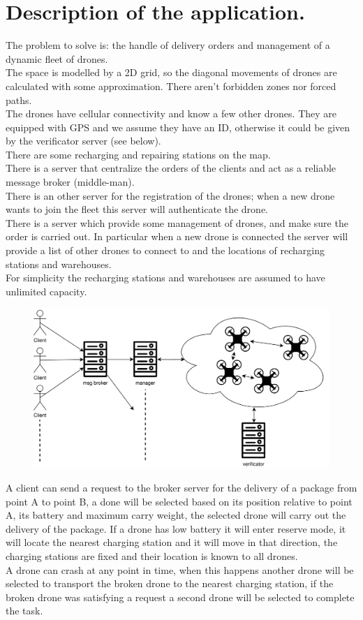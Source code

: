 \documentclass[a4paper, oneside]{memoir}
\begin{document}
\section{Description of the application.}
The problem to solve is: the handle of delivery orders and management of a dynamic fleet of drones.\\
The space is modelled by a 2D grid, so the diagonal movements of drones are calculated with some approximation. There aren't forbidden zones nor forced paths.\\
The drones have cellular connectivity and know a few other drones. They are equipped with GPS and we assume they have an ID, otherwise it could be given by the verificator server (see below).\\
There are some recharging and repairing stations on the map.\\
There is a server that centralize the orders of the clients and act as a reliable message broker (middle-man).\\
There is an other server for the registration of the drones; when a new drone wants to join the fleet this server will authenticate the drone.\\
There is a server which provide some management of drones, and make sure the order is carried out. In particular when a new drone is connected the server will provide a list of other drones to connect to and the locations of recharging stations and warehouses.\\
For simplicity the recharging stations and warehouses are assumed to have unlimited capacity.

\begin{figure}[h!]
	\centering
	\includegraphics[width=\linewidth]{Overview}
\end{figure}

A client can send a request to the broker server for the delivery of a package from point A to point B, a done will be selected based on its position relative to point A, its  battery and maximum carry weight, the selected drone will carry out the delivery of the package.
If a drone has low battery it will enter reserve mode, it will locate the nearest charging station and it will move in that direction, the charging stations are fixed and their location is known to all drones.\\
A drone can crash at any point in time, when this happens another drone will be selected to transport the broken drone to the nearest charging station, if the broken drone was satisfying a request a second drone will be selected to complete the task.
\end{document}
